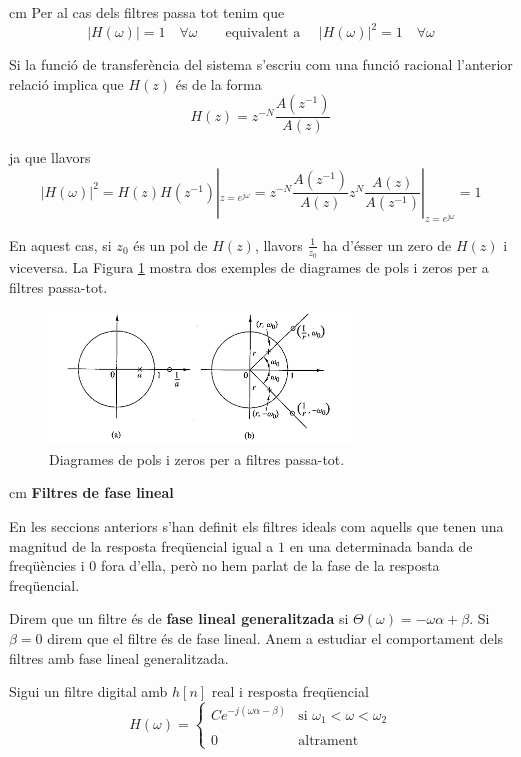 \documentclass{article}
\begin{document}
 cm
Per al cas dels filtres passa tot tenim que 
\[
|H(\omega)|=1 \quad \forall \omega \qquad \text{equivalent a } \quad |H(\omega)|^2=1 \quad \forall \omega
\]

Si la funció de transferència del sistema s'escriu com una funció racional l'anterior relació
implica que $H(z)$ és de la forma 
\[
H(z)=z^{-N} \frac{A(z^{-1})}{A(z)}
\]

\noindent
ja que llavors
\[
|H(\omega)|^2=H(z) H(z^{-1})|_{z=e^{j\omega}}= z^{-N} \frac{A(z^{-1})}{A(z)} z^{N} \frac{A(z)}{A(z^{-1})}|_{z=e^{j\omega}}= 1
\]

En aquest cas, si $z_0$ \'es un pol de $H(z)$, llavors $\frac{1}{z_0}$ ha d'ésser un zero de $H(z)$ i viceversa.
La Figura \ref{polszerospassatot} mostra dos exemples de diagrames de pols i zeros per a filtres passa-tot.

\begin{figure}[htbp]
\begin{center}
\includegraphics[width=8cm]{polszerospassatot.png}
\end{center}
\caption{Diagrames de pols i zeros per a filtres passa-tot.}
\label{polszerospassatot}
\end{figure}

 cm
\noindent
\textbf{Filtres de fase lineal}

En les seccions anteriors s'han definit els filtres ideals com aquells que tenen una magnitud 
de la resposta freqüencial igual a $1$ en una determinada banda de freqüències i $0$ fora
d'ella, però no hem parlat de la fase de la resposta freqüencial.

Direm que un filtre és de \textbf{fase lineal generalitzada} si $\Theta(\omega)=-\omega \alpha + \beta$.
Si $\beta=0$ direm que el filtre és de fase lineal. Anem a estudiar el comportament
dels filtres amb fase lineal generalitzada.

Sigui un filtre digital amb $h[n]$ real i resposta freqüencial
\[
H(\omega)=\begin{cases} C e^{-j( \omega \alpha - \beta)} & \text{si } \omega_1 < \omega < \omega_2 \\ \\
0 & \text{altrament} \end{cases}
\]
\end{document}
